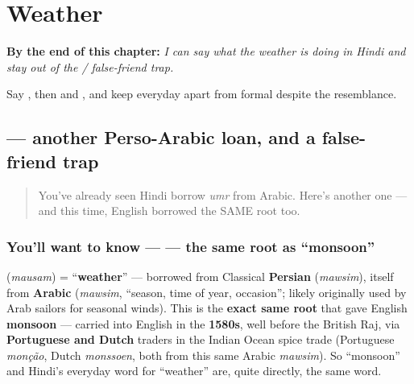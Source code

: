 
\chapter{Weather}
\label{ch:hi-weather}

\begin{chapteropening}
\textbf{By the end of this chapter:} \emph{I can say what the weather is doing in Hindi and stay out of the  /  false-friend trap.}

Say , then   and  , and keep everyday  apart from formal  despite the resemblance.
\end{chapteropening}

\section[\texorpdfstring{\hi{मौसम} / \hi{गर्मी} \hi{है} … (mausam / garmī …)}{मौसम / गर्मी है … (mausam / garmī …)}]{ — another Perso-Arabic loan, and a false-friend trap}

\label{lesson:HI-C20-mausam}



\begin{quote}
You've already seen Hindi borrow \emph{umr} from Arabic. Here's another one — and this time, English borrowed the SAME root too.
\end{quote}

\subsection*{You'll want to know —  — the same root as \textquotedblleft{}monsoon\textquotedblright{}}
\textbf{} (\emph{mausam}) = \textquotedblleft{}\textbf{weather}\textquotedblright{} — borrowed from Classical \textbf{Persian} \textbf{} (\emph{mawsim}), itself from \textbf{Arabic} \textbf{} (\emph{mawsim}, \textquotedblleft{}season, time of year, occasion\textquotedblright{}; likely originally used by Arab sailors for seasonal winds). This is the \textbf{exact same root} that gave English \textbf{monsoon} — carried into English in the \textbf{1580s}, well before the British Raj, via \textbf{Portuguese and Dutch} traders in the Indian Ocean spice trade (Portuguese \emph{monção}, Dutch \emph{monssoen}, both from this same Arabic \emph{mawsim}). So \textquotedblleft{}monsoon\textquotedblright{} and Hindi's everyday word for \textquotedblleft{}weather\textquotedblright{} are, quite directly, the same word.

